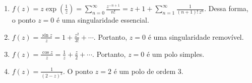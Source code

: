 \begin{questions}
%
\begin{solution}
\begin{enumerate}[label=(\alph*)]
    \item $\displaystyle f(z) = z \exp\left(\frac{1}{z}\right) = \sum_{n=0}^\infty \frac{z^{-n+1}}{n!} = z + 1 + \sum_{n=1}^\infty \frac{1}{(n+1)!\,z^n}$. Dessa forma, o ponto $z=0$ é uma singularidade essencial.
    \item $\displaystyle f(z) = \frac{\sin z}{z} = 1 + \frac{z^2}{3!} + \cdots$. Portanto, $z=0$ é uma singularidade removível.
    \item $\displaystyle f(z) = \frac{\cos z}{z} = \frac{1}{z} + \frac{z}{2} + \cdots$. Portanto, $z=0$ é um polo simples.
    \item $\displaystyle f(z) = \frac{1}{(2-z)^3}$. O ponto $z=2$ é um polo de ordem 3.
\end{enumerate}
\end{solution}


\end{questions}
